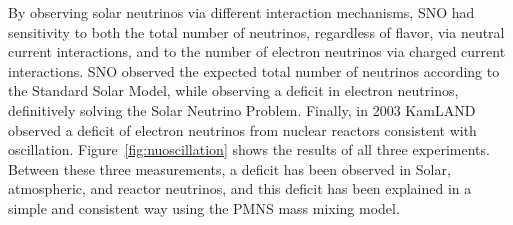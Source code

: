 \documentclass[/main.tex]{subfiles}
\begin{document}
By observing solar neutrinos via different interaction mechanisms, SNO had sensitivity to both the total number of neutrinos, regardless of flavor, via neutral current interactions, and to the number of electron neutrinos via charged current interactions.
SNO observed the expected total number of neutrinos according to the Standard Solar Model\cite{Bahcall2005}, while observing a deficit in electron neutrinos, definitively solving the Solar Neutrino Problem\cite{SNO2002}.
Finally, in 2003 KamLAND observed a deficit of electron neutrinos from nuclear reactors consistent with oscillation\cite{kamland2003}.
Figure~\ref{fig:nuoscillation} shows the results of all three experiments.
Between these three measurements, a deficit has been observed in Solar, atmospheric, and reactor neutrinos, and this deficit has been explained in a simple and consistent way using the PMNS mass mixing model.
\end{document}

